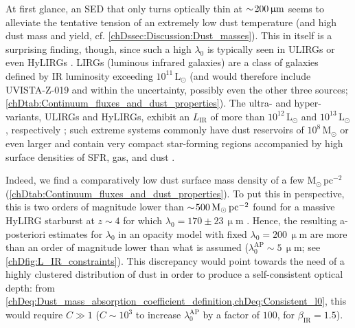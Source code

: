 At first glance, an SED that only turns optically thin at $\sim \! 200 \, \mathrm{\upmu m}$ seems to alleviate the tentative tension of an extremely low dust temperature (and high dust mass and yield, cf. \cref{chDssec:Discussion:Dust_masses}). This in itself is a surprising finding, though, since such a high $\lambda_0$ is typically seen in ULIRGs or even HyLIRGs \citep[e.g.][]{2020MNRAS.498.4192F, 2020A&A...634L..14C}. LIRGs (luminous infrared galaxies) are a class of galaxies defined by IR luminosity exceeding $10^{11} \, \mathrm{L_\odot}$ (and would therefore include UVISTA-Z-019 and within the uncertainty, possibly even the other three sources; \cref{chDtab:Continuum_fluxes_and_dust_properties}). The ultra- and hyper-variants, ULIRGs and HyLIRGs, exhibit an $L_\text{IR}$ of more than $10^{12} \, \mathrm{L_\odot}$ and $10^{13} \, \mathrm{L_\odot}$, respectively \citep{1996ARA&A..34..749S}; such extreme systems commonly have dust reservoirs of $10^{8} \, \mathrm{M_\odot}$ or even larger and contain very compact star-forming regions accompanied by high surface densities of SFR, gas, and dust \citep{2010MNRAS.403..274C}.

Indeed, we find a comparatively low dust surface mass density of a few $\mathrm{M_\odot \, pc^{-2}}$ (\cref{chDtab:Continuum_fluxes_and_dust_properties}). To put this in perspective, this is two orders of magnitude lower than $\sim \! 500 \, \mathrm{M_\odot \, pc^{-2}}$ found for a massive HyLIRG starburst at $z \sim 4$ for which $\lambda_0 = 170 \pm 23 \, \mathrm{\upmu m}$ \citep{2020A&A...634L..14C}. Hence, the resulting a-posteriori estimates for $\lambda_0$ in an opacity model with fixed $\lambda_0 = 200 \, \mathrm{\upmu m}$ are more than an order of magnitude lower than what is assumed ($\lambda_0^\text{AP} \sim 5 \, \mathrm{\upmu m}$; see \cref{chDfig:L_IR_constraints}). This discrepancy would point towards the need of a highly clustered distribution of dust in order to produce a self-consistent optical depth: from \cref{chDeq:Dust_mass_absorption_coefficient_definition,chDeq:Consistent_l0}, this would require $C \gg 1$ ($C \sim 10^3$ to increase $\lambda_0^\text{AP}$ by a factor of $100$, for $\beta_\text{IR} = 1.5$).

